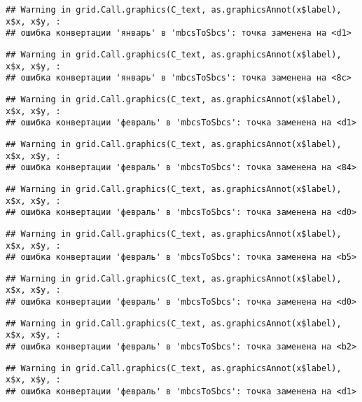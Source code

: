 \documentclass[
]{article}
\begin{document}
\begin{verbatim}
## Warning in grid.Call.graphics(C_text, as.graphicsAnnot(x$label), x$x, x$y, :
## ошибка конвертации 'январь' в 'mbcsToSbcs': точка заменена на <d1>
\end{verbatim}

\begin{verbatim}
## Warning in grid.Call.graphics(C_text, as.graphicsAnnot(x$label), x$x, x$y, :
## ошибка конвертации 'январь' в 'mbcsToSbcs': точка заменена на <8c>
\end{verbatim}

\begin{verbatim}
## Warning in grid.Call.graphics(C_text, as.graphicsAnnot(x$label), x$x, x$y, :
## ошибка конвертации 'февраль' в 'mbcsToSbcs': точка заменена на <d1>
\end{verbatim}

\begin{verbatim}
## Warning in grid.Call.graphics(C_text, as.graphicsAnnot(x$label), x$x, x$y, :
## ошибка конвертации 'февраль' в 'mbcsToSbcs': точка заменена на <84>
\end{verbatim}

\begin{verbatim}
## Warning in grid.Call.graphics(C_text, as.graphicsAnnot(x$label), x$x, x$y, :
## ошибка конвертации 'февраль' в 'mbcsToSbcs': точка заменена на <d0>
\end{verbatim}

\begin{verbatim}
## Warning in grid.Call.graphics(C_text, as.graphicsAnnot(x$label), x$x, x$y, :
## ошибка конвертации 'февраль' в 'mbcsToSbcs': точка заменена на <b5>
\end{verbatim}

\begin{verbatim}
## Warning in grid.Call.graphics(C_text, as.graphicsAnnot(x$label), x$x, x$y, :
## ошибка конвертации 'февраль' в 'mbcsToSbcs': точка заменена на <d0>
\end{verbatim}

\begin{verbatim}
## Warning in grid.Call.graphics(C_text, as.graphicsAnnot(x$label), x$x, x$y, :
## ошибка конвертации 'февраль' в 'mbcsToSbcs': точка заменена на <b2>
\end{verbatim}

\begin{verbatim}
## Warning in grid.Call.graphics(C_text, as.graphicsAnnot(x$label), x$x, x$y, :
## ошибка конвертации 'февраль' в 'mbcsToSbcs': точка заменена на <d1>
\end{verbatim}
\end{document}
